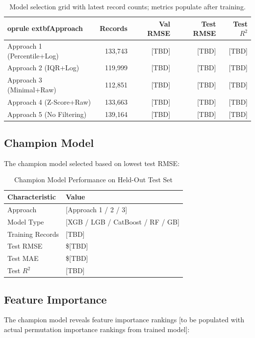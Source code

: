 \documentclass[12pt,a4paper]{article}
\begin{document}
\begin{table}[H]
\centering\small
\begin{tabular}{lrrrr}
	oprule
	extbf{Approach} & \textbf{Records} & \textbf{Val RMSE} & \textbf{Test RMSE} & \textbf{Test $R^2$} \\
\midrule
Approach 1 (Percentile+Log) & 133{,}743 & [TBD] & [TBD] & [TBD] \\
Approach 2 (IQR+Log) & 119{,}999 & [TBD] & [TBD] & [TBD] \\
Approach 3 (Minimal+Raw) & 112{,}851 & [TBD] & [TBD] & [TBD] \\
Approach 4 (Z-Score+Raw) & 133{,}663 & [TBD] & [TBD] & [TBD] \\
Approach 5 (No Filtering) & 139{,}164 & [TBD] & [TBD] & [TBD] \\
\bottomrule
\end{tabular}
\caption{Model selection grid with latest record counts; metrics populate after training.}
\end{table}

\subsection{Champion Model}

The champion model selected based on lowest test RMSE:

\begin{table}[H]
\centering\small
\begin{tabular}{ll}
\toprule
\textbf{Characteristic} & \textbf{Value} \\
\midrule
Approach & [Approach 1 / 2 / 3] \\
Model Type & [XGB / LGB / CatBoost / RF / GB] \\
Training Records & [TBD] \\
Test RMSE & \$[TBD] \\
Test MAE & \$[TBD] \\
Test $R^2$ & [TBD] \\
\bottomrule
\end{tabular}
\caption{Champion Model Performance on Held-Out Test Set}
\end{table}

\subsection{Feature Importance}

The champion model reveals feature importance rankings [to be populated with actual permutation importance rankings from trained model]:
\end{document}
